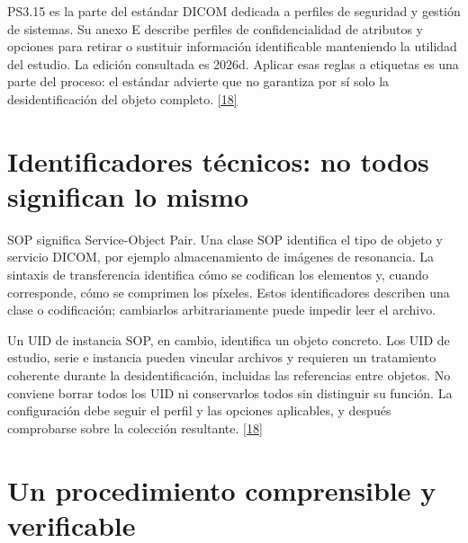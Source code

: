 PS3.15 es la parte del estándar DICOM dedicada a perfiles de seguridad y gestión de sistemas. Su anexo E describe perfiles de confidencialidad de atributos y opciones para retirar o sustituir información identificable manteniendo la utilidad del estudio. La edición consultada es 2026d. Aplicar esas reglas a etiquetas es una parte del proceso: el estándar advierte que no garantiza por sí solo la desidentificación del objeto completo. \hyperlink{refR18}{[18]}


\section{Identificadores técnicos: no todos significan lo mismo}

SOP significa Service-Object Pair. Una clase SOP identifica el tipo de objeto y servicio DICOM, por ejemplo almacenamiento de imágenes de resonancia. La sintaxis de transferencia identifica cómo se codifican los elementos y, cuando corresponde, cómo se comprimen los píxeles. Estos identificadores describen una clase o codificación; cambiarlos arbitrariamente puede impedir leer el archivo.


Un UID de instancia SOP, en cambio, identifica un objeto concreto. Los UID de estudio, serie e instancia pueden vincular archivos y requieren un tratamiento coherente durante la desidentificación, incluidas las referencias entre objetos. No conviene borrar todos los UID ni conservarlos todos sin distinguir su función. La configuración debe seguir el perfil y las opciones aplicables, y después comprobarse sobre la colección resultante. \hyperlink{refR18}{[18]}


\section{Un procedimiento comprensible y verificable}

